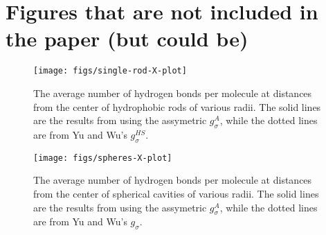 \documentclass[twocolumn,amsmath,amssymb,prl]{revtex4-1}
\begin{document}

\clearpage

\section{Figures that are not included in the paper (but could be)}

\begin{figure}
\begin{center}
\texttt{[image: figs/single-rod-X-plot]}
\end{center}
\caption{ The average number of hydrogen bonds per molecule at
  distances from the center of hydrophobic rods of various
  radii. The solid lines are the results from using the assymetric
  $g_{\sigma}^A$, while the dotted lines are from Yu and Wu's $g_{\sigma}^{HS}$.}
\label{fig:single-rod-X}
\end{figure}

\begin{figure}
\begin{center}
\texttt{[image: figs/spheres-X-plot]}
\end{center}
\caption{ The average number of hydrogen bonds per molecule at
  distances from the center of spherical cavities of various
  radii. The solid lines are the results from using the assymetric
  $g_{\sigma}^A$, while the dotted lines are from Yu and Wu's $g_{\sigma}$.}
\label{fig:spheres-X}
\end{figure}
\end{document}
